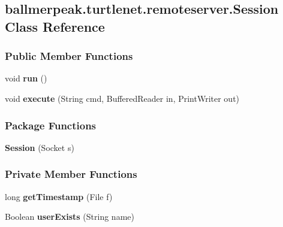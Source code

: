 \hypertarget{classballmerpeak_1_1turtlenet_1_1remoteserver_1_1Session}{\subsection{ballmerpeak.\-turtlenet.\-remoteserver.\-Session Class Reference}
\label{classballmerpeak_1_1turtlenet_1_1remoteserver_1_1Session}
}
\subsubsection*{Public Member Functions}
\begin{DoxyCompactItemize}
\item 
\hypertarget{classballmerpeak_1_1turtlenet_1_1remoteserver_1_1Session_a5109a88ef4f77fa6419f80df207a08d9}{void {\bfseries run} ()}\label{classballmerpeak_1_1turtlenet_1_1remoteserver_1_1Session_a5109a88ef4f77fa6419f80df207a08d9}

\item 
\hypertarget{classballmerpeak_1_1turtlenet_1_1remoteserver_1_1Session_adb3abede1d8a8751ad7bcc89439721db}{void {\bfseries execute} (String cmd, Buffered\-Reader in, Print\-Writer out)}\label{classballmerpeak_1_1turtlenet_1_1remoteserver_1_1Session_adb3abede1d8a8751ad7bcc89439721db}

\end{DoxyCompactItemize}
\subsubsection*{Package Functions}
\begin{DoxyCompactItemize}
\item 
\hypertarget{classballmerpeak_1_1turtlenet_1_1remoteserver_1_1Session_a31ba0e5f5755afc2f26dfac1e344b371}{{\bfseries Session} (Socket s)}\label{classballmerpeak_1_1turtlenet_1_1remoteserver_1_1Session_a31ba0e5f5755afc2f26dfac1e344b371}

\end{DoxyCompactItemize}
\subsubsection*{Private Member Functions}
\begin{DoxyCompactItemize}
\item 
\hypertarget{classballmerpeak_1_1turtlenet_1_1remoteserver_1_1Session_a5b7f50eb21d441fee5f67637c9c8d4b5}{long {\bfseries get\-Timestamp} (File f)}\label{classballmerpeak_1_1turtlenet_1_1remoteserver_1_1Session_a5b7f50eb21d441fee5f67637c9c8d4b5}

\item 
\hypertarget{classballmerpeak_1_1turtlenet_1_1remoteserver_1_1Session_ae149d39f26b4a47b7ae7751921249f76}{Boolean {\bfseries user\-Exists} (String name)}\label{classballmerpeak_1_1turtlenet_1_1remoteserver_1_1Session_ae149d39f26b4a47b7ae7751921249f76}

\end{DoxyCompactItemize}
